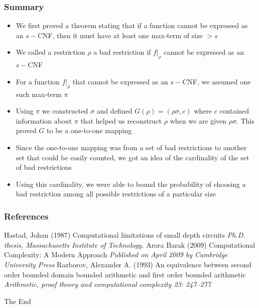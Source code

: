 \documentclass{beamer}[11pt]
\begin{document}
\begin{frame}
 \frametitle{Summary}
 \begin{itemize}
  \item We first proved a theorem stating that if a function cannot be expressed as an $s-$CNF, then it must have at least one max-term of size  $>s$
  \item We called a restriction $\rho$ a bad restriction if $f|_\rho$ cannot be expressed as an $s-$CNF
  \item For a function $f|_\rho$ that cannot be expressed as an $s-$CNF, we assumed one such max-term $\pi$
  \item Using $\pi$ we constructed $\sigma$ and defined $G(\rho)=(\rho\sigma,c) $ where $c$ contained information about $\pi$ that helped us reconstruct $\rho$ when we are given $\rho\sigma$. This proved $G$ to be a one-to-one mapping
  \item Since the one-to-one mapping was from a set of bad restrictions to another set that could be easily counted, we got an idea of the cardinality of the set of bad restrictions
  \item Using this cardinality, we were able to bound the probability of choosing a bad restriction among all possible restrictions of a particular size
 \end{itemize}

\end{frame}


\begin{frame}
\frametitle{References}
\footnotesize{
\begin{thebibliography}{99} %
 Hastad, Johan (1987)
\newblock Computational limitations of small depth circuits
\newblock \emph{Ph.D. thesis, Massachusetts Institute of Technology.}
 Arora Barak (2009)
\newblock Computational Complexity: A Modern Approach
\newblock \emph{Published on April 2009 by Cambridge University Press}
Razborov, Alexander A. (1993)
\newblock An equivalence between second order bounded domain bounded arithmetic and first order bounded arithmetic
\newblock \emph{Arithmetic, proof theory and computational complexity 23: 247–277}
\end{thebibliography}
}
\end{frame}


\begin{frame}
\Huge{\centerline{The End}}
\end{frame}

\end{document}
